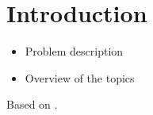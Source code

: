 \chapter{Introduction}
    \begin{itemize}
        \item Problem description
        \item Overview of the topics
    \end{itemize}
    Based on \cite{AssignmentExpert2026}.